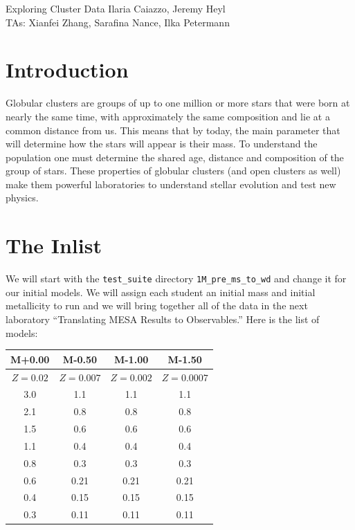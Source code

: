 \documentclass{article}
\begin{document}
\begin{titlebox}{Exploring Cluster Data}
Ilaria Caiazzo, Jeremy Heyl \\
TAs: Xianfei Zhang, Sarafina Nance, Ilka Petermann
\end{titlebox}

\section{Introduction}

Globular clusters are groups of up to one million or more stars that were born at nearly the same time, with approximately the same composition and lie at a common distance from us.  This means that by today, the main parameter that will determine how the stars will appear is their mass. To understand the population one must determine the shared age, distance and composition of the group of stars. These properties of globular clusters (and open clusters as well) make them powerful laboratories to understand stellar evolution and test new physics.

\section{The Inlist}

We will start with the \texttt{test\_suite} directory \texttt{1M\_pre\_ms\_to\_wd} and change it for our initial models.  We will assign each student an initial mass and initial metallicity to run and we will bring together all of the data in the next laboratory ``Translating MESA Results to Observables.'' Here is the list of models:

\begin{center}
\begin{tabular}{c|ccc}
\hline
M+0.00 &
M-0.50 &
M-1.00 &
M-1.50 
\\
\hline
$Z=0.02$ &
$Z=0.007$ &
$Z=0.002$ & 
$Z=0.0007$ 
\\  
\hline 
3.0 & 1.1 & 1.1 & 1.1  \\
2.1 & 0.8 & 0.8 & 0.8  \\
1.5 & 0.6 & 0.6 & 0.6 \\
1.1 & 0.4 & 0.4 & 0.4  \\
0.8 & 0.3 & 0.3 & 0.3  \\
0.6 & 0.21 & 0.21 & 0.21 \\
0.4 & 0.15 & 0.15 & 0.15 \\
0.3 & 0.11 & 0.11 & 0.11 
\end{tabular}
\end{center}
\end{document}
